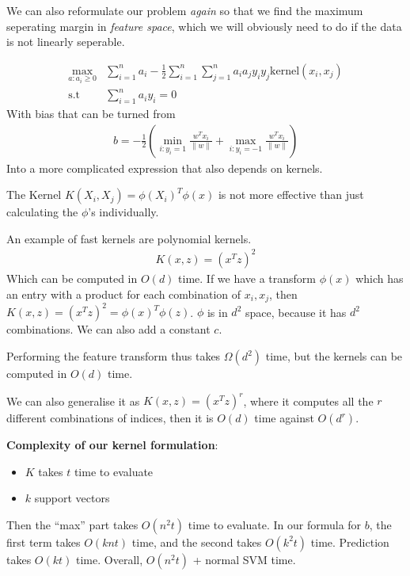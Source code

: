 \documentclass{article}
\begin{document}
    We can also reformulate our problem \emph{again} so that we find the maximum seperating margin in \emph{feature space}, which we will obviously need to do if the data is not linearly seperable. 

    \begin{align}
      \max_{a : a_i \geq 0} & \sum_{i = 1}^{n} a_i - \frac{1}{2}\sum_{i=1}^{n}\sum_{j=1}^{n} a_i a_j y_i y_j \text{kernel}(x_i, x_j) \\
      \text{s.t } & \sum_{i=1}^{n} a_i y_i = 0
    \end{align}
    With bias that can be turned from
    \begin{align}
        b = -\frac{1}{2}(\min_{i: y_i = 1} \frac{w^T x_i}{\lVert w \rVert} + \max_{i: y_i = -1} \frac{w^T x_i}{\lVert w \rVert})
    \end{align}
    Into a more complicated expression that also depends on kernels.
    
    The Kernel $K(X_i, X_j) = \phi(X_i)^T \phi(x)$ is not more effective than just calculating the $\phi$'s individually.
    
    An example of fast kernels are polynomial kernels.
    \begin{align}
        K(x, z) = (x^Tz)^2
    \end{align}
    Which can be computed in $O(d)$ time. If we have a transform $\phi(x)$ which has an entry with a product for each combination of $x_i, x_j$, then $K(x, z) = (x^Tz)^2 = \phi(x)^T \phi(z)$. $\phi$ is in $d^2$ space, because it has $d^2$ combinations. We can also add a constant $c$. 
    
    Performing the feature transform thus takes $\Omega(d^2)$ time, but the kernels can be computed in $O(d)$ time.
    
    We can also generalise it as $K(x,z) = (x^Tz)^r$, where it computes all the $r$ different combinations of indices, then it is $O(d)$ time against $O(d^r)$. 
    
    \textbf{Complexity of our kernel formulation}:
    \begin{itemize}
        \item $K$ takes $t$ time to evaluate
        \item $k$ support vectors
    \end{itemize}
    Then the ``max'' part takes $O(n^2t)$ time to evaluate. In our formula for $b$, the first term takes $O(knt)$ time, and the second takes $O(k^2t)$ time. Prediction takes $O(kt)$ time. Overall, $O(n^2t)$ + normal SVM time. 
    
\end{document}
